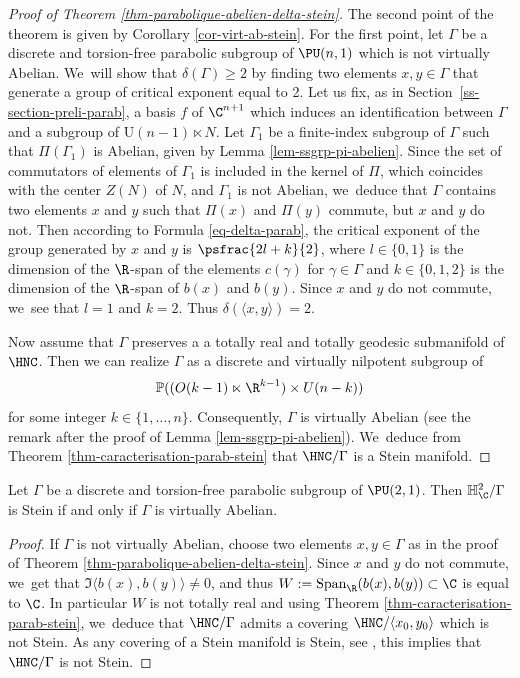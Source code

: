 \begin{proof}[Proof of Theorem \ref{thm-parabolique-abelien-delta-stein}]\Changel
The second point of the theorem is given by Corollary \ref{cor-virt-ab-stein}. For the first point, let $\Gamma$ be a discrete and torsion-free parabolic subgroup of $\PU(n,1)$ which is not virtually Abelian. We~will show that $\delta(\Gamma)\ge2$ by finding two elements $x,y\in \Gamma$ that generate a group of critical exponent equal to 2. Let us fix, as in Section~\ref{ss-section-preli-parab}, a basis $f$ of $\C^{n+1}$ which induces an identification between $\Gamma$ and a subgroup of $\mathrm{U}(n-1)\ltimes N$. Let $\Gamma_1$ be a finite-index subgroup of $\Gamma$ such that $\Pi(\Gamma_1)$ is Abelian, given by Lemma \ref{lem-ssgrp-pi-abelien}. Since the set of commutators of elements of $\Gamma_1$ is included in the kernel of $\Pi$, which coincides with the center $Z(N)$ of $N$, and $\Gamma_1$ is not Abelian, we~deduce that $\Gamma$ contains two elements $x$ and $y$ such that $\Pi(x)$ and $\Pi(y)$ commute, but $x$ and $y$ do not. Then according to Formula \eqref{eq-delta-parab}, the critical exponent of the group generated by $x$ and $y$ is $\psfrac{2l+k}{2}$, where $l\in\{0,1\}$ is the dimension of the $\R$-span of the elements $c(\gamma)$ for $\gamma\in\Gamma$ and $k\in\{0,1,2\}$ is the dimension of the $\R$-span of $b(x)$ and $b(y)$. Since $x$ and $y$ do not commute, we~see that $l=1$ and $k=2$. Thus $\delta(\langle x,y\rangle)=2$.

\Changelback
Now assume that $\Gamma$ preserves a a totally real and totally geodesic submanifold of~$\HNC$. Then we can realize $\Gamma$ as a discrete and virtually nilpotent subgroup of
\begin{equation*}
\mathbb{P}((O(k-1)\ltimes \R^{k-1})\times U(n-k))
\end{equation*}for some integer $k\in\{1,\dots,n\}$. Consequently, $\Gamma$ is virtually Abelian (see the remark after the proof of Lemma \ref{lem-ssgrp-pi-abelien}). We~deduce from Theorem \ref{thm-caracterisation-parab-stein} that $\HNC/\Gamma$ is a Stein manifold.
\end{proof}

\begin{corollary}\label{cor-parab-dim2}
Let $\Gamma$ be a discrete and torsion-free parabolic subgroup of $\PU(2,1)$. Then $\mathbb{H}^{2}_{\C}/\Gamma$ is Stein if and only if $\Gamma$ is virtually Abelian.
\end{corollary}

\begin{proof}
If $\Gamma$ is not virtually Abelian, choose two elements $x,y\in \Gamma$ as in the proof of Theorem \ref{thm-parabolique-abelien-delta-stein}. Since $x$ and $y$ do not commute, we~get that $\Im\langle b(x),b(y)\rangle \ne 0$, and thus $W:=\operatorname{Span}_{\R}(b(x),b(y))\subset\C$ is equal to $\C$. In particular $W$ is not totally real and using Theorem \ref{thm-caracterisation-parab-stein}, we~deduce that $\HNC/\Gamma$ admits a covering $\HNC/\langle x_0,y_0\rangle$ which is not Stein. As any covering of a Stein manifold is Stein, see \cite{steinUberlagerungenHolomorphvollstandigerKomplexer1956}, this implies that $\HNC/\Gamma$ is not Stein.
\end{proof}

